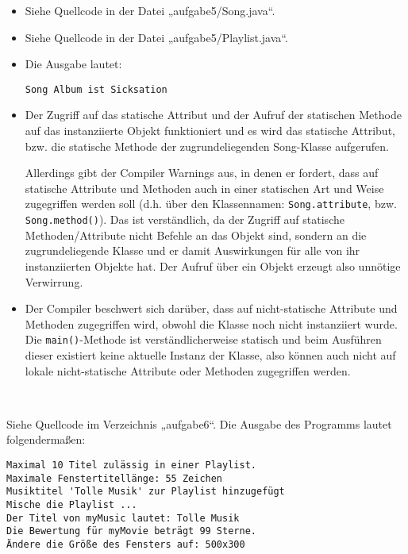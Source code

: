\documentclass{mywork}
\begin{document}
\begin{aufgabe}
	\begin{itemize}
		\item
			Siehe Quellcode in der Datei „aufgabe5/Song.java“.
		\item
			Siehe Quellcode in der Datei „aufgabe5/Playlist.java“.
		\item
			Die Ausgabe lautet:
			\begin{verbatim}
Song Album ist Sicksation
			\end{verbatim}
		\item
			Der Zugriff auf das statische Attribut und der Aufruf der statischen Methode auf das instanziierte Objekt funktioniert und es wird das statische Attribut, bzw. die statische Methode der zugrundeliegenden Song-Klasse aufgerufen.

			Allerdings gibt der Compiler Warnings aus, in denen er fordert, dass auf statische Attribute und Methoden auch in einer statischen Art und Weise zugegriffen werden soll (d.h. über den Klassennamen: \verb|Song.attribute|, bzw. \verb|Song.method()|).
			Das ist verständlich, da der Zugriff auf statische Methoden/Attribute nicht Befehle an das Objekt sind, sondern an die zugrundeliegende Klasse und er damit Auswirkungen für alle von ihr instanziierten Objekte hat.
			Der Aufruf über ein Objekt erzeugt also unnötige Verwirrung.
		\item
			Der Compiler beschwert sich darüber, dass auf nicht-statische Attribute und Methoden zugegriffen wird, obwohl die Klasse noch nicht instanziiert wurde.
			Die \verb|main()|-Methode ist verständlicherweise statisch und beim Ausführen dieser existiert keine aktuelle Instanz der Klasse, also können auch nicht auf lokale nicht-statische Attribute oder Methoden zugegriffen werden.
	\end{itemize}

\end{aufgabe}

\begin{aufgabe}~

	Siehe Quellcode im Verzeichnis „aufgabe6“.
	Die Ausgabe des Programms lautet folgendermaßen:
	\begin{verbatim}
Maximal 10 Titel zulässig in einer Playlist.
Maximale Fenstertitellänge: 55 Zeichen
Musiktitel 'Tolle Musik' zur Playlist hinzugefügt
Mische die Playlist ...
Der Titel von myMusic lautet: Tolle Musik
Die Bewertung für myMovie beträgt 99 Sterne.
Ändere die Größe des Fensters auf: 500x300
	\end{verbatim}
\end{aufgabe}
\end{document}
